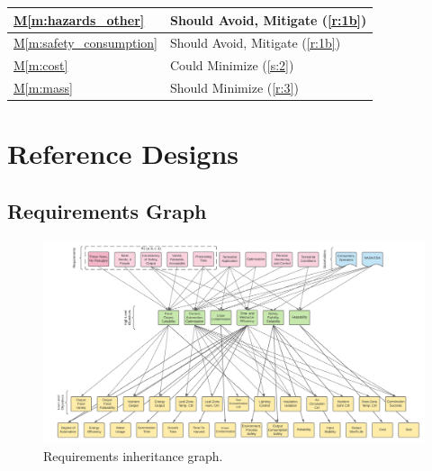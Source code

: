 \documentclass{../tex/report}
\newcommand{\mref}[1]{\hyperref[#1]{M\ref{#1}}}
\begin{document}
\begin{tabular}{|l|p{14.35cm}|}
    \mref{m:hazards_other}              & Should Avoid, Mitigate    \hfill (\ref{r:1b})                         \\ \hline
    \mref{m:safety_consumption}         & Should Avoid, Mitigate    \hfill (\ref{r:1b})                         \\ \hline
    \mref{m:cost}                       & Could Minimize            \hfill (\ref{s:2})                          \\ \hline
    \mref{m:mass}                       & Should Minimize           \hfill (\ref{r:3})                          \\ \hline
\end{tabular}


\clearpage

\section{Reference Designs}



\clearpage

\begin{appendices}
\section{Requirements Graph}

\begin{figure}[h]
  \centering
  \includegraphics[width=\textwidth,angle=90,origin=c]{../assets/figures/requirements.png}
  \caption{Requirements inheritance graph.}
  \label{fig:requirements-graph}
\end{figure}

\end{appendices}

\clearpage



\end{document}
